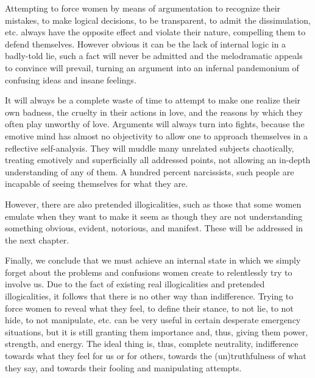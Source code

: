 \par Attempting to force women by means of argumentation to recognize their mistakes, to make logical decisions, to be transparent, to admit the dissimulation, etc. always have the opposite effect and violate their nature, compelling them to defend themselves. However obvious it can be the lack of internal logic in a badly-told lie, such a fact will never be admitted and the melodramatic appeals to convince will prevail, turning an argument into an infernal pandemonium of confusing ideas and insane feelings.

\par It will always be a complete waste of time to attempt to make one realize their own badness, the cruelty in their actions in love, and the reasons by which they often play unworthy of love. Arguments will always turn into fights, because the emotive mind has almost no objectivity to allow one to approach themselves in a reflective self-analysis. They will muddle many unrelated subjects chaotically, treating emotively and superficially all addressed points, not allowing an in-depth understanding of any of them. A hundred percent narcissists, such people are incapable of seeing themselves for what they are.

\par However, there are also pretended illogicalities, such as those that some women emulate when they want to make it seem as though they are not understanding something obvious, evident, notorious, and manifest. These will be addressed in the next chapter.

\par Finally, we conclude that we must achieve an internal state in which we simply forget about the problems and confusions women create to relentlessly try to involve us. Due to the fact of existing real illogicalities and pretended illogicalities, it follows that there is no other way than indifference. Trying to force women to reveal what they feel, to define their stance, to not lie, to not hide, to not manipulate, etc. can be very useful in certain desperate emergency situations, but it is still granting them importance and, thus, giving them power, strength, and energy. The ideal thing is, thus, complete neutrality, indifference towards what they feel for us or for others, towards the (un)truthfulness of what they say, and towards their fooling and manipulating attempts.